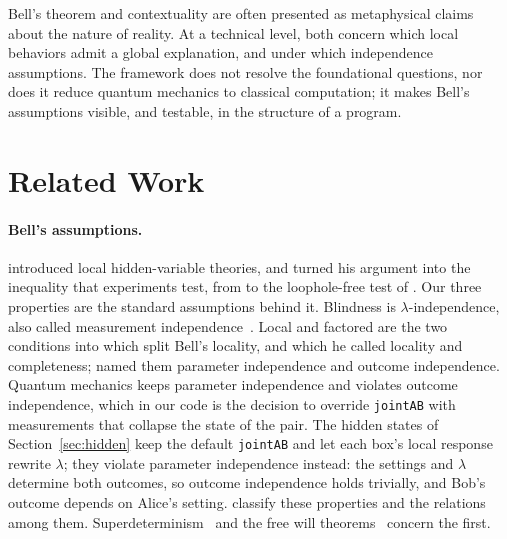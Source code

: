 \documentclass[11pt]{article}
\newcommand{\hs}{\lstinline[style=hask,basicstyle=\ttfamily,frame=none]}
\begin{document}
Bell's theorem and contextuality are often presented as metaphysical claims about the nature of reality. At a technical level, both concern which local behaviors admit a global explanation, and under which independence assumptions. The framework does not resolve the foundational questions, nor does it reduce quantum mechanics to classical computation; it makes Bell's assumptions visible, and testable, in the structure of a program.

\section{Related Work}\label{sec:related}

\paragraph{Bell's assumptions.} \citet{Bell1964} introduced local hidden-variable theories, and \citet{CHSH1969} turned his argument into the inequality that experiments test, from \citet{Aspect1982} to the loophole-free test of \citet{Hensen2015}. Our three properties are the standard assumptions behind it. Blindness is $\lambda$-independence, also called measurement independence~\citep{Brunner2014}. Local and factored are the two conditions into which \citet{Jarrett1984} split Bell's locality, and which he called locality and completeness; \citet{Shimony1984} named them parameter independence and outcome independence. Quantum mechanics keeps parameter independence and violates outcome independence, which in our code is the decision to override \hs|jointAB| with measurements that collapse the state of the pair. The hidden states of Section~\ref{sec:hidden} keep the default \hs|jointAB| and let each box's local response rewrite $\lambda$; they violate parameter independence instead: the settings and $\lambda$ determine both outcomes, so outcome independence holds trivially, and Bob's outcome depends on Alice's setting. \citet{Brandenburger2008} classify these properties and the relations among them. Superdeterminism~\citep{HossenfelderPalmer2020,Palmer2009,tHooft2016} and the free will theorems~\citep{ConwayKochen2006,ConwayKochen2009} concern the first.
\end{document}
